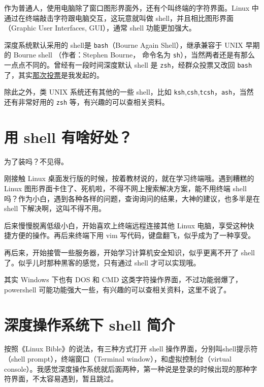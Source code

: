 \documentclass[doctor,openright,twoside]{sjtuthesis}
\newcommand{\passthrough}[1]{#1}
\theoremstyle{plain}
\theoremstyle{definition}
\theoremstyle{remark}
\theoremstyle{ocrenumbox}
\theoremstyle{plain}
\begin{document}
作为普通人，使用电脑除了窗口图形界面外，还有个叫终端的字符界面。Linux 中通过在终端敲击字符跟电脑交互，这玩意就叫做 shell，并且相比图形界面（Graphic User Interfaces, GUI），通常 shell 功能更加强大。

深度系统默认采用的 shell是 \passthrough{\lstinline!bash!}（Bourne Again Shell），继承兼容于 UNIX 早期的 Bourne shell （作者：Stephen Bourne， 命令名为 \passthrough{\lstinline!sh!}），当然两者还是有那么一点点不同的。曾经有一段时间深度默认 shell 是 \passthrough{\lstinline!zsh!}，经群众投票又改回 \passthrough{\lstinline!bash!}了，其实\href{https://bbs.deepin.org/forum.php?mod=viewthread\&tid=30976\&extra=}{那次投票}是我发起的。

除此之外，类 UNIX 系统还有其他的一些 shell，比如 \passthrough{\lstinline!ksh!},\passthrough{\lstinline!csh!},\passthrough{\lstinline!tcsh!}，\passthrough{\lstinline!ash!}，当然还有非常好用的 \passthrough{\lstinline!zsh!} 等，有兴趣的可以查相关资料。

\hypertarget{shell-}{%
\section{用 shell 有啥好处？}\label{shell-}}

为了装吗？不见得。

刚接触 Linux 桌面发行版的时候，按着教材说的，就在学习终端哦。遇到糟糕的 Linux 图形界面卡住了、死机啦，不得不网上搜索解决方案，能不用终端 shell 吗？作为小白，遇到各种各样的问题，查询询问的结果，大神的建议，也多半是在 shell 下解决啊，这叫不得不用。

后来慢慢脱离低级小白，开始喜欢上终端远程连接其他 Linux 电脑，享受这种快捷方便的操作。再后来终端下用 vim 写代码，键盘翻飞，似乎成为了一种享受。

再后来，开始接管一些服务器，开始学习计算机安全知识，似乎更离不开了 shell 了。似乎儿时那种黑客的感觉，只有通过 shell 才可以实现哦。

其实 Windows 下也有 DOS 和 CMD 这类字符操作界面，不过功能弱爆了， powershell 可能功能强大一些，有兴趣的可以查相关资料，这里不说了。

\hypertarget{shell:intro}{%
\section{深度操作系统下 shell 简介}\label{shell:intro}}

按照《Linux Bible》的说法，有三种方式打开 shell 操作界面，分别叫shell提示符（shell prompt），终端窗口（Terminal window），和虚拟控制台（virtual console）。我感觉深度操作系统就后面两种，第一种说是登录的时候出现的那种字符界面，不太容易遇到，暂且跳过。
\end{document}
